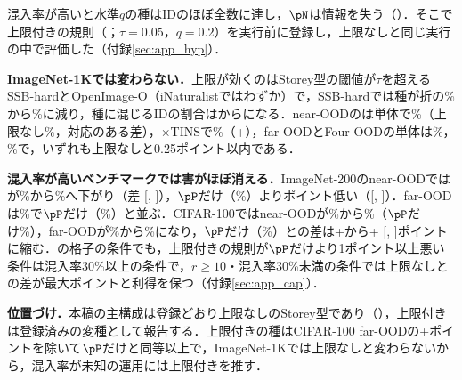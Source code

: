 混入率が高いと水準$q$の種はIDのほぼ全数に達し，$\pN$は情報を失う（）．そこで上限付きの規則（；$\tau{=}0.05$，$q{=}0.2$）を実行前に登録し，上限なしと同じ実行の中で評価した（付録\ref{sec:app_hyp}）．

\textbf{ImageNet-1Kでは変わらない．}上限が効くのはStorey型の閾値が$\tau$を超えるSSB-hardとOpenImage-O（iNaturalistではわずか）で，SSB-hardでは種が折の\NCapSeedSsbHardStoreyRatio\%から\NCapSeedSsbHardStoreycRatio\%に減り，種に混じるIDの割合は\NCapSeedSsbHardStoreyIdfrac{}から\NCapSeedSsbHardStoreycIdfrac{}になる．near-OODの\FPR{}は単体で\NCapStoreycAloneNearFpr\%（上限なし\NAloneNearFpr\%，対応のある差\NCapStoreycAloneNearDfprVsStorey{}），$\times$TINSで\NCapStoreycNearFpr\%（+\NCapStoreycNearDfprVsStorey{}），far-OODとFour-OODの単体は\NCapStoreycAloneFarFpr\%，\NCapStoreycAloneFourFpr\%で，いずれも上限なしと0.25ポイント以内である．

\textbf{混入率が高いベンチマークでは害がほぼ消える．}ImageNet-200のnear-OODでは\FPR{}が\NInTwoZeroZeroMainNearFpr\%から\NInTwoZeroZeroStoreycNearFpr\%へ下がり（差\NInTwoZeroZeroStoreycNearDfprVsStorey{} [\NInTwoZeroZeroStoreycNearDfprVsStoreyLo, \NInTwoZeroZeroStoreycNearDfprVsStoreyHi]），$\pP$だけ（\NInTwoZeroZeroLpNearFpr\%）より\NInTwoZeroZeroStoreycNearDfprVsLpAbs{}ポイント低い（[\NInTwoZeroZeroStoreycNearDfprVsLpLo, \NInTwoZeroZeroStoreycNearDfprVsLpHi]）．far-OODは\NInTwoZeroZeroStoreycFarFpr\%で$\pP$だけ（\NInTwoZeroZeroLpFarFpr\%）と並ぶ．CIFAR-100ではnear-OODが\NCifarMainNearFpr\%から\NCifarStoreycNearFpr\%（$\pP$だけ\NCifarLpNearFpr\%），far-OODが\NCifarMainFarFpr\%から\NCifarStoreycFarFpr\%になり，$\pP$だけ（\NCifarLpFarFpr\%）との差は+\NCifarMainFarDfprVsLp{}から+\NCifarStoreycFarDfprVsLp{} [\NCifarStoreycFarDfprVsLpLo, \NCifarStoreycFarDfprVsLpHi]ポイントに縮む．の格子の\NCaprecNCells{}条件でも，上限付きの規則が$\pP$だけより1ポイント以上悪い条件は混入率30\%以上の\NCaprecNHi{}条件で\NCaprecStoreycHiNWorseLpOne{}，$r\ge10$・混入率30\%未満の\NCaprecLoROneZeroN{}条件では上限なしとの差が最大\NCaprecLoROneZeroMaxStoreycMinusStorey{}ポイントと利得を保つ（付録\ref{sec:app_cap}）．

\textbf{位置づけ．}本稿の主構成は登録どおり上限なしのStorey型であり（），上限付きは登録済みの変種として報告する．上限付きの種はCIFAR-100 far-OODの+\NCifarStoreycFarDfprVsLp{}ポイントを除いて$\pP$だけと同等以上で，ImageNet-1Kでは上限なしと変わらないから，混入率が未知の運用には上限付きを推す．
